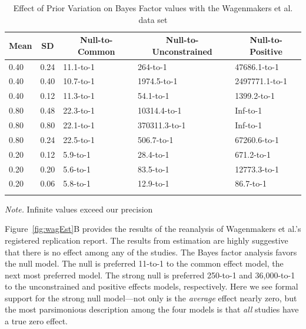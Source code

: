 \documentclass[english,man]{apa6}
\theoremstyle{definition}
\theoremstyle{definition}
\theoremstyle{remark}
\begin{document}
\begin{table}[tbp]
\begin{center}
\begin{threeparttable}
\caption{\label{tab:sens}Effect of Prior Variation on Bayes Factor values with the Wagenmakers et al. data set}
\begin{tabular}{lllll}
\toprule
Mean & \multicolumn{1}{c}{SD} & \multicolumn{1}{c}{Null-to-Common} & \multicolumn{1}{c}{Null-to-Unconstrained} & \multicolumn{1}{c}{Null-to-Positive}\\
\midrule
0.40 & 0.24 & 11.1-to-1 & 264-to-1 & 47686.1-to-1\\
0.40 & 0.40 & 10.7-to-1 & 1974.5-to-1 & 2497771.1-to-1\\
0.40 & 0.12 & 11.3-to-1 & 54.1-to-1 & 1399.2-to-1\\
0.80 & 0.48 & 22.3-to-1 & 10314.4-to-1 & Inf-to-1\\
0.80 & 0.80 & 22.1-to-1 & 370311.3-to-1 & Inf-to-1\\
0.80 & 0.24 & 22.5-to-1 & 506.7-to-1 & 67260.6-to-1\\
0.20 & 0.12 & 5.9-to-1 & 28.4-to-1 & 671.2-to-1\\
0.20 & 0.20 & 5.6-to-1 & 83.5-to-1 & 12773.3-to-1\\
0.20 & 0.06 & 5.8-to-1 & 12.9-to-1 & 86.7-to-1\\
\bottomrule
\addlinespace
\end{tabular}
\begin{tablenotes}[para]
\textit{Note.} Infinite values exceed our precision
\end{tablenotes}
\end{threeparttable}
\end{center}
\end{table}

Figure~\ref{fig:wagEst}B provides the results of the reanalysis of
Wagenmakers et al.'s registered replication report. The results from
estimation are highly suggestive that there is no effect among any of
the studies. The Bayes factor analysis favors the null model. The null
is preferred 11-to-1 to the common effect model, the next most preferred
model. The strong null is preferred 250-to-1 and 36,000-to-1 to the
unconstrained and positive effects models, respectively. Here we see
formal support for the strong null model---not only is the
\emph{average} effect nearly zero, but the most parsimonious description
among the four models is that \emph{all} studies have a true zero
effect.
\end{document}

